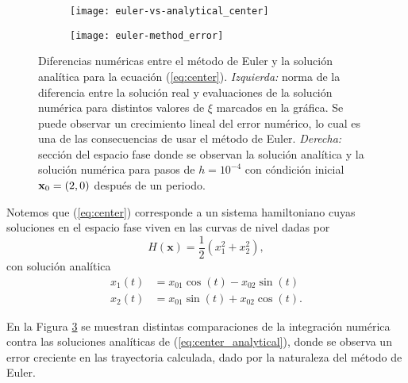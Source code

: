 \begin{figure}[h!]
\centering
\begin{subfigure}{0.49\textwidth}
	\centering
	\texttt{[image: euler-vs-analytical\_center]}
	\label{fig:center-eu_vs_anal}
\end{subfigure}
%
\begin{subfigure}{0.49\textwidth}
	\centering
	\texttt{[image: euler-method\_error]}
	\label{fig:center_not-closed}
\end{subfigure}
\caption{Diferencias numéricas entre el método de Euler y la solución analítica para la ecuación (\ref{eq:center}). \textit{Izquierda:} norma de la diferencia entre la solución real y evaluaciones de la solución numérica para distintos valores de $\xi$ marcados en la gráfica. Se puede observar un crecimiento lineal del error numérico, lo cual es una de las consecuencias de usar el método de Euler. \textit{Derecha:} sección del espacio fase donde se observan la solución analítica y la solución numérica para pasos de $h=10^{-4}$ con cóndición inicial $\mathbf{x}_0 = (2,0)$ después de un periodo.}
\label{fig:center_anal_comparison}
\end{figure}

Notemos que (\ref{eq:center}) corresponde a un sistema hamiltoniano cuyas soluciones en el espacio fase viven en las curvas de nivel dadas por
\begin{equation*}
H(\mathbf{x}) = \frac{1}{2} \left( x_1^2 + x_2^2 \right),
\end{equation*} 
con solución analítica
\begin{align}
 x_1(t) &= x_{01}\cos{(t)} - x_{02}\sin{(t)} \nonumber \\
 x_2(t) &= x_{01}\sin{(t)} + x_{02}\cos{(t)}.
 \label{eq:center_analytical}
\end{align}

En la Figura \ref{fig:center_anal_comparison} se muestran distintas comparaciones de la integración numérica contra las soluciones analíticas de (\ref{eq:center_analytical}), donde se observa un error creciente en las trayectoria calculada, dado por la naturaleza del método de Euler.

